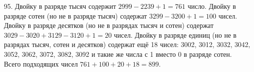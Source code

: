 95. Двойку в разряде тысяч содержит $2999-2239+1=761$ число. Двойку в разряде сотен (но не в разряде тысяч) содержат $3299-3200+1=100$ чисел. Двойку в разряде десятков (но не в разрядах тысяч и сотен) содержат $3029-3020+3129-3120+1=20$ чисел. Двойку в разряде единиц (но не в разрядах тысяч, сотен и десятков) содержат ещё 18 чисел: 3002, 3012, 3032, 3042, 3052, 3062, 3072, 3082, 3092 и такие же числа с 1 вместо 0 в разряде сотен. Всего подходящих чисел $761+100+20+18=899.$\\
